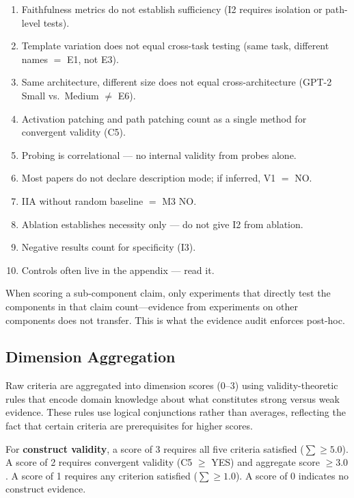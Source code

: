 \documentclass[10pt]{article}
\begin{document}
\begin{enumerate}[nosep]
    \item Faithfulness metrics do not establish sufficiency (I2 requires isolation or path-level tests).
    \item Template variation does not equal cross-task testing (same task, different names $=$ E1, not E3).
    \item Same architecture, different size does not equal cross-architecture (GPT-2 Small vs.\ Medium $\neq$ E6).
    \item Activation patching and path patching count as a single method for convergent validity (C5).
    \item Probing is correlational --- no internal validity from probes alone.
    \item Most papers do not declare description mode; if inferred, V1 $=$ NO.
    \item IIA without random baseline $=$ M3 NO.
    \item Ablation establishes necessity only --- do not give I2 from ablation.
    \item Negative results count for specificity (I3).
    \item Controls often live in the appendix --- read it.
\end{enumerate}

When scoring a sub-component claim, only experiments that directly test the components in that claim count---evidence from experiments on other components does not transfer. This is what the evidence audit enforces post-hoc.

\subsection{Dimension Aggregation}
\label{sec:aggregation}

Raw criteria are aggregated into dimension scores (0--3) using validity-theoretic rules that encode domain knowledge about what constitutes strong versus weak evidence. These rules use logical conjunctions rather than averages, reflecting the fact that certain criteria are prerequisites for higher scores.

For \textbf{construct validity}, a score of 3 requires all five criteria satisfied ($\sum \geq 5.0$). A score of 2 requires convergent validity (C5 $\geq$ YES) and aggregate score $\geq 3.0$. A score of 1 requires any criterion satisfied ($\sum \geq 1.0$). A score of 0 indicates no construct evidence.
\end{document}
